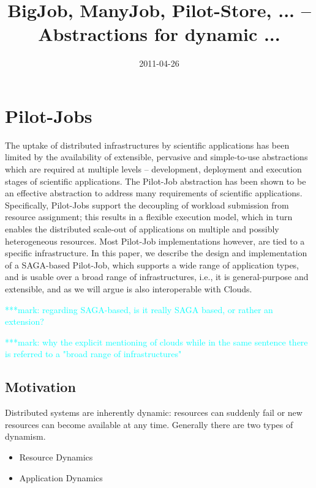 \documentclass[]{article}
\title{BigJob, ManyJob, Pilot-Store, ... -- Abstractions for dynamic ...}
\author{  }
\date{2011-04-26}
\newcommand{\msnote}[1]{ {\textcolor{cyan} { ***mark: #1 }}}
\begin{document}
\ifpdf
{}
\else
{}
\fi

\maketitle


\section{Pilot-Jobs}

The uptake of distributed infrastructures by scientific applications has been
limited by the availability of extensible, pervasive and simple-to-use
abstractions which are required at multiple levels – development, deployment
and execution stages of scientific applications. The Pilot-Job abstraction has
been shown to be an effective abstraction to address many requirements of
scientific applications. Specifically, Pilot-Jobs support the decoupling of
workload submission from resource assignment; this results in a flexible
execution model, which in turn enables the distributed scale-out of
applications on multiple and possibly heterogeneous resources. Most Pilot-Job
implementations however, are tied to a specific infrastructure. In this paper,
we describe the design and implementation of a SAGA-based Pilot-Job, which
supports a wide range of application types, and is usable over a broad range
of infrastructures, i.e., it is general-purpose and extensible, and as we will
argue is also interoperable with Clouds.

\msnote{regarding SAGA-based, is it really SAGA based, or rather an extension?}

\msnote{why the explicit mentioning of clouds while in the same sentence there is referred to a "broad range of infrastructures"}

\subsection{Motivation}

Distributed systems are inherently dynamic: resources can suddenly fail or 
new resources can become available at any time. Generally there are two types
of dynamism.
\begin{itemize}
	\item Resource Dynamics
	\item Application Dynamics
\end{itemize}
\end{document}
